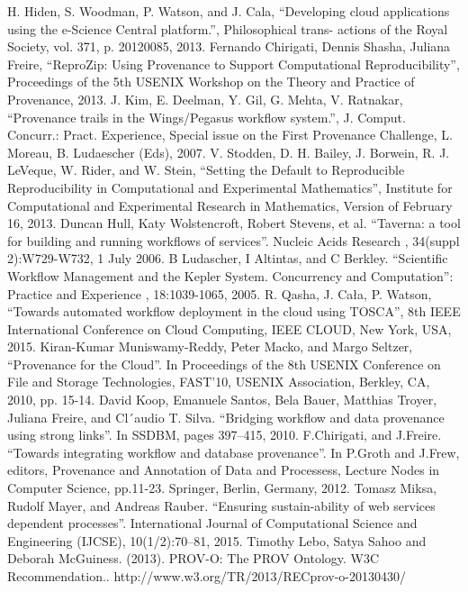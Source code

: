 \documentclass[6pt,,a4paper]{article}
\begin{document}
\begin{thebibliography}{12}
 H. Hiden, S. Woodman, P. Watson, and J. Cala, “Developing cloud applications using the e-Science Central platform.”, Philosophical trans- actions of the Royal Society, vol. 371, p. 20120085, 2013.
 Fernando Chirigati, Dennis Shasha, Juliana Freire, “ReproZip: Using Provenance to Support Computational Reproducibility”, Proceedings of the 5th USENIX Workshop on the Theory and Practice of Provenance, 2013.
 J. Kim, E. Deelman, Y. Gil, G. Mehta, V. Ratnakar, “Provenance trails in the Wings/Pegasus workflow system.”, J. Comput. Concurr.: Pract. Experience, Special issue on the First Provenance Challenge, L. Moreau, B. Ludaescher (Eds), 2007.
 V. Stodden, D. H. Bailey, J. Borwein, R. J. LeVeque, W. Rider, and W. Stein, “Setting the Default to Reproducible Reproducibility in Computational and Experimental Mathematics”, Institute for Computational and Experimental Research in Mathematics, Version of February 16, 2013.
 Duncan Hull, Katy Wolstencroft, Robert Stevens, et al. “Taverna:  a tool for building and running workflows of services”. Nucleic Acids Research , 34(suppl 2):W729-W732, 1 July 2006. 
 B Ludascher, I Altintas, and C Berkley. “Scientific Workflow Management and the Kepler System. Concurrency and Computation”:  Practice and Experience , 18:1039-1065, 2005.
 R. Qasha, J. Cała, P. Watson, “Towards automated workflow deployment in the cloud using TOSCA”, 8th IEEE International Conference on Cloud Computing, IEEE CLOUD, New York, USA, 2015.
 Kiran-Kumar Muniswamy-Reddy, Peter Macko, and Margo Seltzer, “Provenance for the Cloud”. In Proceedings of the 8th USENIX Conference on File and Storage Technologies, FAST’10, USENIX Association, Berkley, CA, 2010, pp. 15-14.
 David Koop, Emanuele Santos, Bela Bauer, Matthias Troyer, Juliana Freire, and Cl´audio T. Silva. “Bridging workflow and data provenance using strong links”. In SSDBM, pages 397–415, 2010. 
 F.Chirigati, and J.Freire. “Towards integrating workflow and database provenance”. In P.Groth and J.Frew, editors, Provenance and Annotation of Data and Processess, Lecture Nodes in Computer Science, pp.11-23. Springer, Berlin, Germany, 2012.
 Tomasz Miksa, Rudolf Mayer, and Andreas Rauber. “Ensuring sustain-ability of web services dependent processes”. International Journal of Computational Science and Engineering (IJCSE), 10(1/2):70–81, 2015.
Timothy Lebo, Satya Sahoo and Deborah McGuiness. (2013). PROV-O: The PROV Ontology. W3C Recommendation.. http://www.w3.org/TR/2013/RECprov-o-20130430/

\end{thebibliography}
\end{document}
